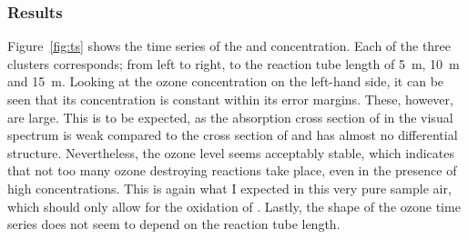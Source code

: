 \subsubsection{Results}
\label{sec:no-results}

Figure~\ref{fig:ts} shows the time series of the  and 
concentration. Each of the three clusters corresponds; from left to
right, to the reaction tube length of \SI{5}{\meter}, \SI{10}{\meter}
and \SI{15}{\meter}. Looking at the ozone concentration on the
left-hand side, it can be seen that its concentration is constant
within its error margins. These, however, are large. This is to be
expected, as the absorption cross section of  in the visual
spectrum is weak compared to the cross section of  and has
almost no differential structure. Nevertheless, the ozone level seems
acceptably stable, which indicates that not too many ozone destroying
reactions take place, even in the presence of high 
concentrations. This is again what I expected in this very pure sample
air, which should only allow for the oxidation of . Lastly, the
shape of the ozone time series does not seem to depend on the reaction
tube length.

